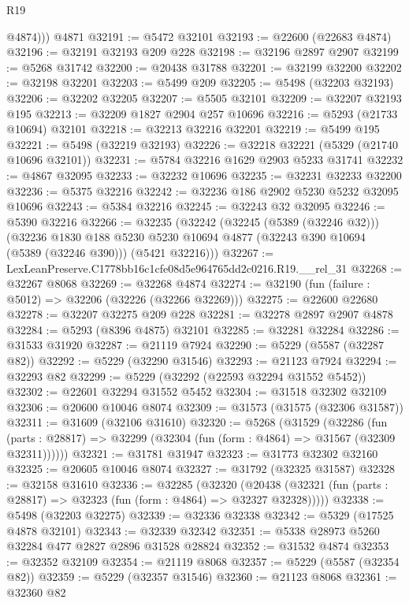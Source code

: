 \begin{lexlean}{R19}
\begin{coremodule}
          @4874)))
    @4871
@32191 := @5472 @32101
@32193 := @22600 (@22683 @4874)
@32196 := @32191 @32193 @209 @228
@32198 := @32196 @2897 @2907
@32199 := @5268 @31742
@32200 := @20438 @31788
@32201 := @32199 @32200
@32202 := @32198 @32201
@32203 := @5499 @209
@32205 := @5498 (@32203 @32193)
@32206 := @32202 @32205
@32207 := @5505 @32101
@32209 := @32207 @32193 @195
@32213 := @32209 @1827 @2904 @257 @10696
@32216 := @5293 (@21733 @10694) @32101
@32218 := @32213 @32216 @32201
@32219 := @5499 @195
@32221 := @5498 (@32219 @32193)
@32226 := @32218 @32221 (@5329 (@21740 @10696 @32101))
@32231 := @5784 @32216 @1629 @2903 @5233 @31741
@32232 := @4867 @32095
@32233 := @32232 @10696
@32235 := @32231 @32233 @32200
@32236 := @5375 @32216
@32242 := @32236 @186 @2902 @5230 @5232 @32095 @10696
@32243 := @5384 @32216
@32245 := @32243 @32 @32095
@32246 := @5390 @32216
@32266 := @32235
    (@32242
      (@32245 (@5389 (@32246 @32)))
      (@32236
        @1830
        @188
        @5230
        @5230
        @10694
        @4877
        (@32243 @390 @10694 (@5389 (@32246 @390)))
        (@5421 @32216)))
@32267 := LexLeanPreserve.C1778bb16c1cfe08d5e964765dd2c0216.R19.__rel_31
@32268 := @32267 @8068
@32269 := @32268 @4874
@32274 := @32190 (fun (failure : @5012) => @32206 (@32226 (@32266 @32269)))
@32275 := @22600 @22680
@32278 := @32207 @32275 @209 @228
@32281 := @32278 @2897 @2907 @4878
@32284 := @5293 (@8396 @4875) @32101
@32285 := @32281 @32284
@32286 := @31533 @31920
@32287 := @21119 @7924
@32290 := @5229 (@5587 (@32287 @82))
@32292 := @5229 (@32290 @31546)
@32293 := @21123 @7924
@32294 := @32293 @82
@32299 := @5229 (@32292 (@22593 @32294 @31552 @5452))
@32302 := @22601 @32294 @31552 @5452
@32304 := @31518 @32302 @32109
@32306 := @20600 @10046 @8074
@32309 := @31573 (@31575 (@32306 @31587))
@32311 := @31609 (@32106 @31610)
@32320 := @5268
    (@31529
      (@32286
        (fun (parts : @28817) => @32299 (@32304 (fun (form : @4864) => @31567 (@32309 @32311))))))
@32321 := @31781 @31947
@32323 := @31773 @32302 @32160
@32325 := @20605 @10046 @8074
@32327 := @31792 (@32325 @31587)
@32328 := @32158 @31610
@32336 := @32285
    (@32320
      (@20438 (@32321 (fun (parts : @28817) => @32323 (fun (form : @4864) => @32327 @32328)))))
@32338 := @5498 (@32203 @32275)
@32339 := @32336 @32338
@32342 := @5329 (@17525 @4878 @32101)
@32343 := @32339 @32342
@32351 := @5338 @28973 @5260 @32284 @477 @2827 @2896 @31528 @28824
@32352 := @31532 @4874
@32353 := @32352 @32109
@32354 := @21119 @8068
@32357 := @5229 (@5587 (@32354 @82))
@32359 := @5229 (@32357 @31546)
@32360 := @21123 @8068
@32361 := @32360 @82

\end{coremodule}
\end{lexlean}
